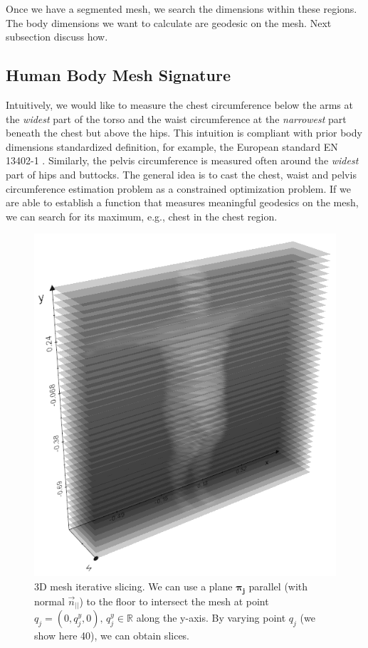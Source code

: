 \documentclass[runningheads, orivec]{llncs}
\begin{document}
Once we have a segmented mesh, we search the dimensions within 
these regions. The body dimensions we want to calculate are 
geodesic on the mesh. Next subsection discuss how.


\subsection{Human Body Mesh Signature}\label{subsec:hbm_signature}
Intuitively, we would like to measure the chest circumference below the arms 
at the \textit{widest} part of the torso and the waist circumference at the 
\textit{narrowest} part beneath the chest but above the hips. This intuition is 
compliant 
with prior body dimensions standardized definition, for example, the European 
standard EN 13402-1 \cite{en13402-1}. Similarly, the pelvis 
circumference is measured often around the \textit{widest} part of hips and 
buttocks. The general idea is to cast the chest, waist and pelvis circumference 
estimation problem as a constrained optimization problem. If we are able to 
establish a 
function that measures meaningful geodesics on the mesh, we can search for its 
maximum, 
e.g., chest in the chest region.

\begin{figure}[H]
	\begin{center}
		\includegraphics[width=0.5\linewidth]{subject_2_with_cutting_planes_xrays.png}
	\end{center}
	\caption{3D mesh iterative slicing. We 
		can use a plane $\boldsymbol{\pi_j}$ parallel (with normal 
		$\vec{n}_{||}$) to the 
		floor to intersect the mesh at point $q_j = (0, q^y_j, 0), \,  q^y_j 
		\in 
		\mathbb{R}$ along the y-axis. By varying point $q_j$ (we show here 40), 
		we can obtain 
		slices.}
	\label{fig:subjects_planes_xrays}
\end{figure}
\end{document}
